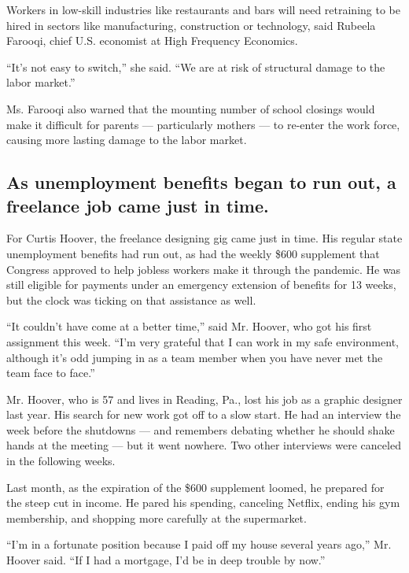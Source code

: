Workers in low-skill industries like restaurants and bars will need
retraining to be hired in sectors like manufacturing, construction or
technology, said Rubeela Farooqi, chief U.S. economist at High Frequency
Economics.

``It's not easy to switch,'' she said. ``We are at risk of structural
damage to the labor market.''

Ms. Farooqi also warned that the mounting number of school closings
would make it difficult for parents --- particularly mothers --- to
re-enter the work force, causing more lasting damage to the labor
market.

\hypertarget{as-unemployment-benefits-began-to-run-out-a-freelance-job-came-just-in-time}{%
\subsection{As unemployment benefits began to run out, a freelance job
came just in
time.}\label{as-unemployment-benefits-began-to-run-out-a-freelance-job-came-just-in-time}}

For Curtis Hoover, the freelance designing gig came just in time. His
regular state unemployment benefits had run out, as had the weekly \$600
supplement that Congress approved to help jobless workers make it
through the pandemic. He was still eligible for payments under an
emergency extension of benefits for 13 weeks, but the clock was ticking
on that assistance as well.

``It couldn't have come at a better time,'' said Mr. Hoover, who got his
first assignment this week. ``I'm very grateful that I can work in my
safe environment, although it's odd jumping in as a team member when you
have never met the team face to face.''

Mr. Hoover, who is 57 and lives in Reading, Pa., lost his job as a
graphic designer last year. His search for new work got off to a slow
start. He had an interview the week before the shutdowns --- and
remembers debating whether he should shake hands at the meeting --- but
it went nowhere. Two other interviews were canceled in the following
weeks.

Last month, as the expiration of the \$600 supplement loomed, he
prepared for the steep cut in income. He pared his spending, canceling
Netflix, ending his gym membership, and shopping more carefully at the
supermarket.

``I'm in a fortunate position because I paid off my house several years
ago,'' Mr. Hoover said. ``If I had a mortgage, I'd be in deep trouble by
now.''

